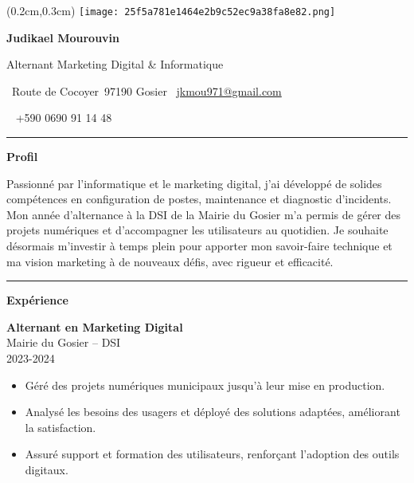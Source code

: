 \documentclass[a4paper]{article}
\renewcommand{\colorbox}[2]{#2}%
\newcommand{\fullrule}{\hspace{-1.5cm}\rule{\paperwidth}{0.4pt}}
\newcommand{\cvsection}[1]{%
  \vspace{6pt}\textbf{\Large #1}\par\vspace{2pt}}
\begin{document}
\color{white}
\begin{textblock*}{4cm}(0.2cm,0.3cm)
  \texttt{[image: 25f5a781e1464e2b9c52ec9a38fa8e82.png]}
\end{textblock*}

\begin{center}
  {\fontsize{44pt}{24pt}\selectfont\bfseries Judikael Mourouvin}

  \bigskip
  {\Large Alternant Marketing Digital \& Informatique}

  \bigskip\bigskip
  \faMapMarker~Route de Cocoyer\ 97190 Gosier
  \quad\faEnvelope~\href{mailto:jkmou971@gmail.com}{jkmou971@gmail.com}

  \bigskip
  \faPhone~ +590 0690 91 14 48
  \quad \faLinkedin\ \href{}{}
 

  \vspace{-0.3cm}
  \fullrule
\end{center}

\cvsection{Profil}

Passionné par l’informatique et le marketing digital, j’ai développé de solides compétences en configuration de postes, maintenance et diagnostic d’incidents. Mon année d’alternance à la DSI de la Mairie du Gosier m’a permis de gérer des projets numériques et d’accompagner les utilisateurs au quotidien. Je souhaite désormais m’investir à temps plein pour apporter mon savoir-faire technique et ma vision marketing à de nouveaux défis, avec rigueur et efficacité.

\medskip\fullrule

\cvsection{Expérience}
\hspace*{1.3cm}%

\colorbox{maincolor}{%
  \begin{minipage}{\linewidth}
    \textbf{Alternant en Marketing Digital} \\ Mairie du Gosier – DSI \\ 2023-2024
    \begin{itemize}
      \item Géré des projets numériques municipaux jusqu’à leur mise en production. \item Analysé les besoins des usagers et déployé des solutions adaptées, améliorant la satisfaction. \item Assuré support et formation des utilisateurs, renforçant l’adoption des outils digitaux.
    \end{itemize}
  \end{minipage}}
\end{document}

